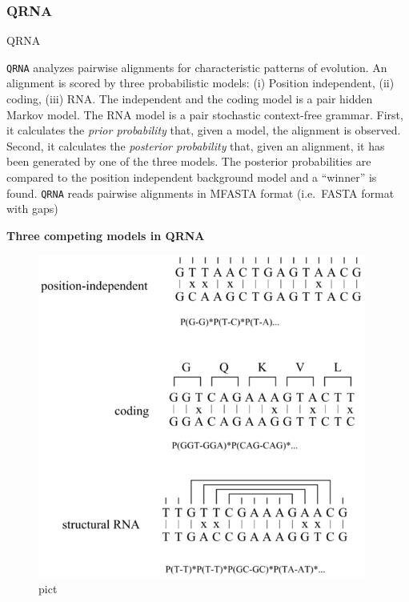 \documentclass[]{article}
\begin{document}
\subsubsection{QRNA}{QRNA}\label{qrna}

\texttt{QRNA} analyzes pairwise alignments for characteristic patterns
of evolution. An alignment is scored by three probabilistic models: (i)
Position independent, (ii) coding, (iii) RNA. The independent and the
coding model is a pair hidden Markov model. The RNA model is a pair
stochastic context-free grammar. First, it calculates the \emph{prior
probability} that, given a model, the alignment is observed. Second, it
calculates the \emph{posterior probability} that, given an alignment, it
has been generated by one of the three models. The posterior
probabilities are compared to the position independent background model
and a ``winner'' is found. \texttt{QRNA} reads pairwise alignments in
MFASTA format (i.e.~FASTA format with gaps)

\textbf{Three competing models in QRNA}\\

\begin{figure}[htbp]
\centering
\includegraphics{Figs/qrna.png}
\caption{pict}
\end{figure}
\end{document}
